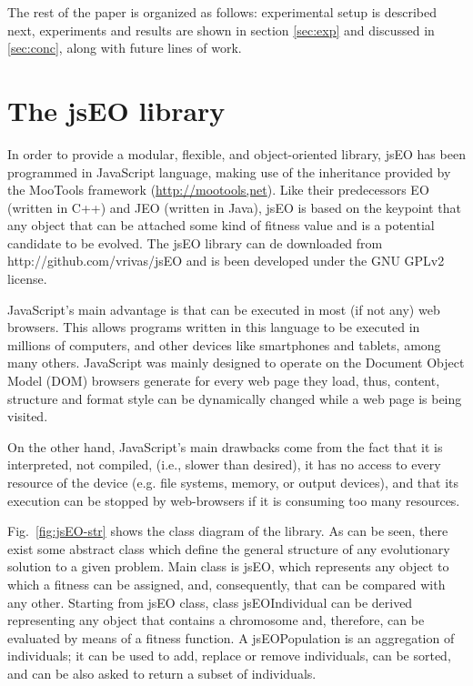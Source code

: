 \documentclass{llncs}
\begin{document}
The rest of the paper is organized as follows: experimental setup is described next,  experiments and results are shown in section 
\ref{sec:exp} and discussed in \ref{sec:conc}, along with future lines
of work. 

\section{The jsEO library}
\label{sec:jseo}
In order to provide a modular, flexible, and object-oriented library, jsEO has been programmed in JavaScript language, making use of the inheritance provided by the MooTools framework (\url{http://mootools,net}). Like their predecessors EO (written in C++) and JEO (written in Java), jsEO is based on the keypoint that any object that can be attached some kind of fitness value and is a potential candidate to be evolved. The jsEO library can de downloaded from http://github.com/vrivas/jsEO and is been developed under the GNU GPLv2 license.

JavaScript's main advantage is that can be executed in most (if not any) web browsers. This allows programs written in this language to be executed in millions of computers, and other devices like smartphones and tablets, among many others. JavaScript was mainly designed to operate on the Document Object Model (DOM) browsers generate for every web page they load, thus, content, structure and format style can be dynamically changed while a web page is being visited.

On the other hand, JavaScript's main drawbacks come from the fact that it is interpreted, not compiled, (i.e., slower than desired), it has no access to every resource of the device (e.g. file systems,  memory, or output devices), and that its execution can be stopped by web-browsers if it is consuming too many resources.

Fig.~\ref{fig:jsEO-str} shows the class diagram of the library. As can be seen, there exist some abstract class which define the general structure of any evolutionary solution to a given problem. Main class is jsEO, which represents any object to which a fitness can be assigned, and, consequently, that can be compared with any other. Starting from jsEO class, class jsEOIndividual can be derived representing any object that contains a chromosome and, therefore, can be evaluated by means of a fitness function. A jsEOPopulation is an aggregation of individuals; it can be used to add, replace or remove individuals, can be sorted, and can be also asked to return a subset of individuals.
\end{document}
